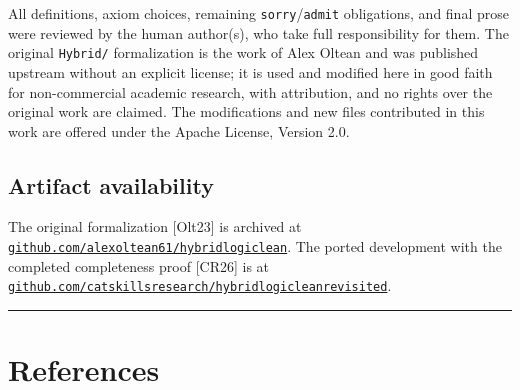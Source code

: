 \documentclass[11pt,a4paper]{article}
\renewcommand{\_}{\origtextunderscore\allowbreak}
\begin{document}
All definitions, axiom choices, remaining \texttt{sorry}/\texttt{admit} obligations, and final prose were reviewed by the human author(s), who take full responsibility for them. The original \texttt{Hybrid/} formalization is the work of Alex Oltean and was published upstream without an explicit license; it is used and modified here in good faith for non-commercial academic research, with attribution, and no rights over the original work are claimed. The modifications and new files contributed in this work are offered under the Apache License, Version 2.0.

\hypertarget{artifact-availability}{%
\subsection{Artifact availability}\label{artifact-availability}}

The original formalization {[}Olt23{]} is archived at \href{https://github.com/alexoltean61/hybrid_logic_lean}{\texttt{github.com/alexoltean61/hybrid\_logic\_lean}}. The ported development with the completed completeness proof {[}CR26{]} is at \href{https://github.com/catskillsresearch/hybrid_logic_lean_revisited}{\texttt{github.com/catskillsresearch/hybrid\_logic\_lean\_revisited}}.

\begin{center}\rule{0.5\linewidth}{0.5pt}\end{center}

\hypertarget{references}{%
\section{References}\label{references}}
\end{document}
